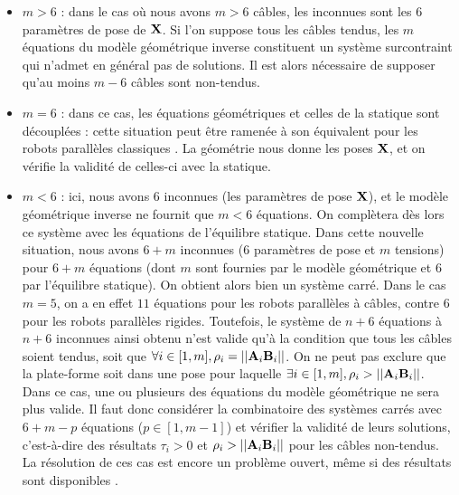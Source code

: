\begin{itemize}
  \item $m > 6$ : dans le cas o\`u nous avons $m > 6$ c\^ables, les inconnues 
sont les $6$ param\`etres de pose de $\bf X$. Si l'on suppose tous les c\^ables 
tendus, les $m$ \'equations du mod\`ele g\'eom\'etrique inverse constituent un 
syst\`eme surcontraint qui n'admet en g\'en\'eral pas de solutions. Il est 
alors n\'ecessaire de supposer qu'au moins $m-6$ c\^ables sont non-tendus.
  \item $m = 6$ : dans ce cas, les \'equations g\'eom\'etriques et celles de la 
statique sont d\'ecoupl\'ees : cette situation peut \^etre ramen\'ee \`a son 
\'equivalent pour les robots parall\`eles classiques \cite{husty94} 
\cite{wampler96} \cite{rouillier95} \cite{merlet2004solving}. La g\'eom\'etrie 
nous donne les poses $\bf X$, et on v\'erifie la validit\'e de celles-ci avec 
la statique.
  \item $m < 6$ : ici, nous avons $6$ inconnues (les param\`etres de 
pose $\bf X$), et le mod\`ele g\'eom\'etrique inverse ne fournit que $m < 6$ 
\'equations. On compl\`etera d\`es lors ce syst\`eme avec les \'equations de 
l'\'equilibre statique. Dans cette nouvelle situation, nous avons $6 + m$ 
inconnues ($6$ param\`etres de pose et $m$ tensions) pour $6 + m$ \'equations 
(dont $m$ sont fournies par le mod\`ele g\'eom\'etrique et $6$ par l'\'equilibre 
statique). On obtient alors bien un syst\`eme carr\'e. Dans le cas 
$m = 5$, on a en effet $11$ \'equations pour les robots parall\`eles \`a 
c\^ables, contre $6$ pour les robots parall\`eles rigides. Toutefois, le 
syst\`eme de $n+6$ \'equations \`a $n+6$ inconnues ainsi obtenu n'est valide 
qu'\`a la condition que tous les c\^ables soient tendus, soit que $\forall i 
\in [1,m], \rho_i = ||{\bf A}_i{\bf B}_i||$. On ne peut pas exclure que la 
plate-forme soit dans une pose pour la\-quelle $\exists i \in [1,m], \rho_i > 
||{\bf A}_i{\bf B}_i||$. Dans ce cas, une ou plusieurs des \'equations du 
mod\`ele g\'eom\'etrique ne sera plus valide. Il faut donc consid\'erer la 
combinatoire des syst\`emes carr\'es avec $6+m-p$ \'equations ($p \in [1, 
m-1]$) et v\'erifier la validit\'e de leurs solutions, c'est-\`a-dire des 
r\'esultats $\tau_i > 0$ et $\rho_i > ||{\bf A}_i{\bf B}_i||$ pour les 
c\^ables non-tendus. La r\'esolution de ces cas est encore un probl\`eme 
ouvert, m\^eme si des r\'esultats sont disponibles 
\cite{carricato2014cables5} \cite{carricato2013cables4} 
\cite{2011:Carricato.Merlet} \cite{kumar2011}.
\end{itemize}

